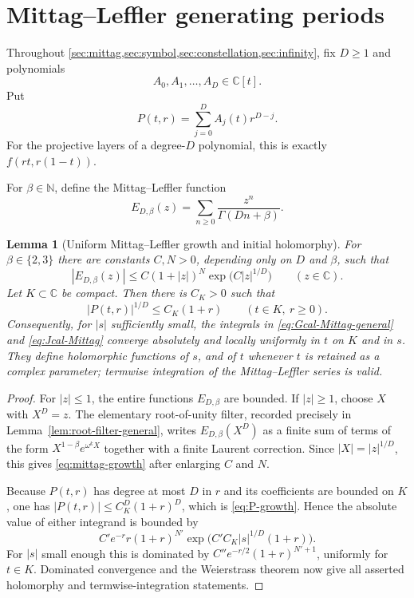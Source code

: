 \documentclass[11pt]{article}
\numberwithin{equation}{section}
\newtheorem{lemma}[lemma]{Lemma}
\theoremstyle{definition}
\theoremstyle{remark}
\newcommand{\C}{\mathbb C}
\newcommand{\N}{\mathbb N}
\begin{document}
\section{Mittag--Leffler generating periods}\label{sec:mittag}

Throughout \cref{sec:mittag,sec:symbol,sec:constellation,sec:infinity}, fix $D\ge1$ and polynomials
\[
  A_0,A_1,\ldots,A_D\in\C[t].
\]
Put
\begin{equation}\label{eq:P-general}
  P(t,r)=\sum_{j=0}^D A_j(t)r^{D-j}.
\end{equation}
For the projective layers of a degree-$D$ polynomial, this is exactly $f(rt,r(1-t))$.

For $\beta\in\N$, define the Mittag--Leffler function
\begin{equation}\label{eq:mittag-general}
  E_{D,\beta}(z)=\sum_{n\ge0}\frac{z^n}{\Gamma(Dn+\beta)}.
\end{equation}

\begin{lemma}[Uniform Mittag--Leffler growth and initial holomorphy]
\label{lem:mittag-growth}
For $\beta\in\{2,3\}$ there are constants $C,N>0$, depending only on
$D$ and $\beta$, such that
\begin{equation}\label{eq:mittag-growth}
  |E_{D,\beta}(z)|
  \le C(1+|z|)^N\exp\!\bigl(C|z|^{1/D}\bigr)
  \qquad(z\in\C).
\end{equation}
Let $K\subset\C$ be compact.  Then there is $C_K>0$ such that
\begin{equation}\label{eq:P-growth}
  |P(t,r)|^{1/D}\le C_K(1+r)
  \qquad(t\in K,\ r\ge0).
\end{equation}
Consequently, for $|s|$ sufficiently small, the integrals in
\eqref{eq:Gcal-Mittag-general} and \eqref{eq:Jcal-Mittag} converge
absolutely and locally uniformly in $t$ on $K$ and in $s$.  They define
holomorphic functions of $s$, and of $t$ whenever $t$ is retained as a
complex parameter; termwise integration of the Mittag--Leffler series is
valid.
\end{lemma}

\begin{proof}
For $|z|\le1$, the entire functions $E_{D,\beta}$ are bounded.  If
$|z|\ge1$, choose $X$ with $X^D=z$.  The elementary root-of-unity filter, recorded precisely in
Lemma~\ref{lem:root-filter-general}, writes
$E_{D,\beta}(X^D)$ as a finite sum of terms of the form
$X^{1-\beta}e^{\omega^kX}$ together with a finite Laurent correction.
Since $|X|=|z|^{1/D}$, this gives \eqref{eq:mittag-growth} after enlarging
$C$ and $N$.

Because $P(t,r)$ has degree at most $D$ in $r$ and its coefficients are
bounded on $K$, one has $|P(t,r)|\le C_K^D(1+r)^D$, which is
\eqref{eq:P-growth}.  Hence the absolute value of either integrand is
bounded by
\[
  C'e^{-r}r(1+r)^{N'}
  \exp\!\bigl(C'C_K|s|^{1/D}(1+r)\bigr).
\]
For $|s|$ small enough this is dominated by
$C''e^{-r/2}(1+r)^{N'+1}$, uniformly for $t\in K$.  Dominated convergence
and the Weierstrass theorem now give all asserted holomorphy and
termwise-integration statements.
\end{proof}
\end{document}
